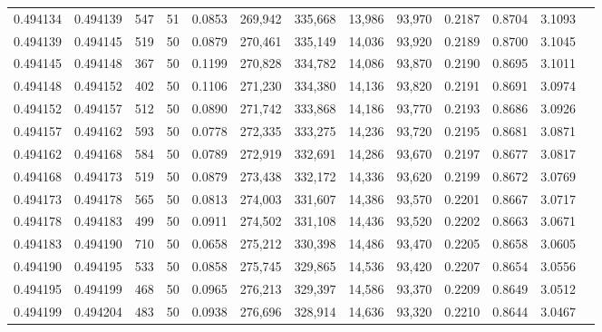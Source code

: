 \begin{tabular}{rrrrrrrrrrrrr}
0.494134 & 0.494139 &   547 &  51 &                                     0.0853 & 269,942 & 335,668 &  13,986 &  93,970 & 0.2187 & 0.8704 & 3.1093 \\
0.494139 & 0.494145 &   519 &  50 &                                     0.0879 & 270,461 & 335,149 &  14,036 &  93,920 & 0.2189 & 0.8700 & 3.1045 \\
0.494145 & 0.494148 &   367 &  50 &                                     0.1199 & 270,828 & 334,782 &  14,086 &  93,870 & 0.2190 & 0.8695 & 3.1011 \\
0.494148 & 0.494152 &   402 &  50 &                                     0.1106 & 271,230 & 334,380 &  14,136 &  93,820 & 0.2191 & 0.8691 & 3.0974 \\
0.494152 & 0.494157 &   512 &  50 &                                     0.0890 & 271,742 & 333,868 &  14,186 &  93,770 & 0.2193 & 0.8686 & 3.0926 \\
0.494157 & 0.494162 &   593 &  50 &                                     0.0778 & 272,335 & 333,275 &  14,236 &  93,720 & 0.2195 & 0.8681 & 3.0871 \\
0.494162 & 0.494168 &   584 &  50 &                                     0.0789 & 272,919 & 332,691 &  14,286 &  93,670 & 0.2197 & 0.8677 & 3.0817 \\
0.494168 & 0.494173 &   519 &  50 &                                     0.0879 & 273,438 & 332,172 &  14,336 &  93,620 & 0.2199 & 0.8672 & 3.0769 \\
0.494173 & 0.494178 &   565 &  50 &                                     0.0813 & 274,003 & 331,607 &  14,386 &  93,570 & 0.2201 & 0.8667 & 3.0717 \\
0.494178 & 0.494183 &   499 &  50 &                                     0.0911 & 274,502 & 331,108 &  14,436 &  93,520 & 0.2202 & 0.8663 & 3.0671 \\
0.494183 & 0.494190 &   710 &  50 &                                     0.0658 & 275,212 & 330,398 &  14,486 &  93,470 & 0.2205 & 0.8658 & 3.0605 \\
0.494190 & 0.494195 &   533 &  50 &                                     0.0858 & 275,745 & 329,865 &  14,536 &  93,420 & 0.2207 & 0.8654 & 3.0556 \\
0.494195 & 0.494199 &   468 &  50 &                                     0.0965 & 276,213 & 329,397 &  14,586 &  93,370 & 0.2209 & 0.8649 & 3.0512 \\
0.494199 & 0.494204 &   483 &  50 &                                     0.0938 & 276,696 & 328,914 &  14,636 &  93,320 & 0.2210 & 0.8644 & 3.0467 \\

\end{tabular}

